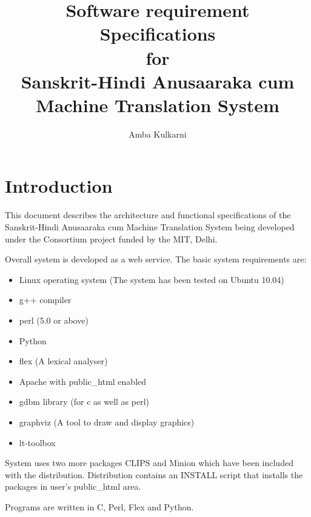 \documentclass{llncs}
\title{Software requirement Specifications \\ for \\Sanskrit-Hindi Anusaaraka cum Machine Translation System}
\author{Amba Kulkarni}
\institute{Department of Sanskrit Studies, \\University of Hyderabad, \\Hyderabad\\
\email{apksh@uohyd.ac.in / ambapradeep@gmail.com}
}
\date{}
\begin{document}
\frenchspacing
\noindent
\maketitle

\section{Introduction}
This document describes the architecture and functional specifications of the Sanskrit-Hindi Anusaaraka cum Machine Translation System being developed under the Consortium project funded by the MIT, Delhi.

\noindent 
Overall system is developed as a web service. The basic system requirements are:

\begin{itemize}
\item Linux operating system (The system has been tested on Ubuntu 10.04)
\item g++ compiler
\item perl (5.0 or above)
\item Python
\item flex (A lexical analyser)
\item Apache with public\_html enabled
\item gdbm library (for c as well as perl)
\item graphviz (A tool to draw and display graphics)
\item lt-toolbox
\end{itemize}

\noindent 
System uses two more packages CLIPS and Minion which have been included with the distribution. Distribution contains an INSTALL script that installs the packages in user's public\_html area.

\noindent 
Programs are written in C, Perl, Flex and Python.
\end{document}

